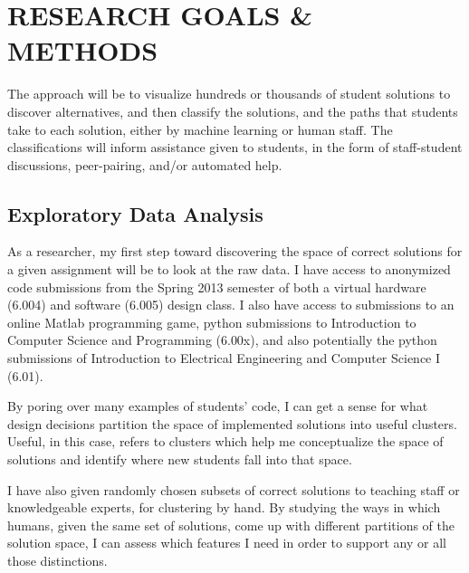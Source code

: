 \documentclass[12pt]{article}
\begin{document}
\section{RESEARCH GOALS \& METHODS}

The approach will be to visualize hundreds or thousands of student solutions to discover alternatives, and then classify the solutions, and the paths that students take to each solution, either by machine learning or human staff. The classifications will inform assistance given to students, in the form of staff-student discussions, peer-pairing, and/or automated help.


\subsection{Exploratory Data Analysis}

As a researcher, my first step toward discovering the space of correct solutions for a given assignment will be to look at the raw data. I have access to anonymized code submissions from the Spring 2013 semester of both a virtual hardware (6.004) and software (6.005) design class. I also have access to submissions to an online Matlab programming game, python submissions to Introduction to Computer Science and Programming (6.00x), and also potentially the python submissions of Introduction to Electrical Engineering and Computer Science I (6.01). 

By poring over many examples of students' code, I can get a sense for what design decisions partition the space of implemented solutions into useful clusters. Useful, in this case, refers to clusters which help me conceptualize the space of solutions and identify where new students fall into that space. 

I have also given randomly chosen subsets of correct solutions to teaching staff or knowledgeable experts, for clustering by hand. By studying the ways in which humans, given the same set of solutions, come up with different partitions of the solution space, I can assess which features I need in order to support any or all those distinctions. 
\end{document}
